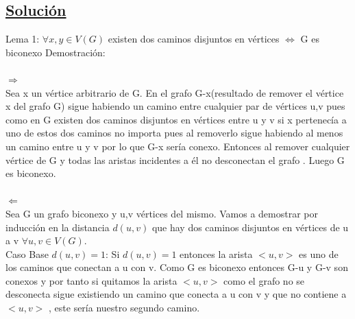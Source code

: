 \documentclass{article}
\begin{document}
    \subsection{\underline{Soluci\'on}} 
    Lema 1:\newline
    $\forall x,y\in V(G)$ existen dos caminos disjuntos en v\'ertices $\Longleftrightarrow$ G es biconexo \newline
    \newline
    Demostraci\'on:\\\\
    $\Longrightarrow$\\
    Sea x un v\'ertice arbitrario de G. En el grafo G-x(resultado de remover el v\'ertice x del grafo G)
    sigue habiendo un camino entre cualquier par de v\'ertices u,v pues como en G existen dos caminos disjuntos en v\'ertices
    entre u y v si x pertenec\'ia a uno de estos dos caminos no importa pues al removerlo sigue habiendo al menos un camino 
    entre u y v por lo que G-x ser\'ia conexo. Entonces al remover cualquier v\'ertice de G y todas las aristas incidentes a
    \'el no desconectan el grafo . Luego G es biconexo.\\\\
    $\Longleftarrow$\\
    Sea G un grafo biconexo y u,v v\'ertices del mismo. Vamos a demostrar por inducci\'on en la distancia $d(u,v)$ que hay
    dos caminos disjuntos en v\'ertices de u a v $\forall u,v \in V(G)$.\\
    \newline
    Caso Base $d(u,v)=1$:\newline
    Si $d(u,v)=1$ entonces la arista $<u,v>$ es uno de los caminos que conectan a u con v. Como G es biconexo entonces 
    G-u y G-v son conexos y por tanto si quitamos la  arista $<u,v>$  como el grafo no se desconecta sigue existiendo
    un camino que conecta a u con v y que no contiene a $<u,v>$ , este ser\'ia nuestro segundo camino.\\
    
\end{document}

